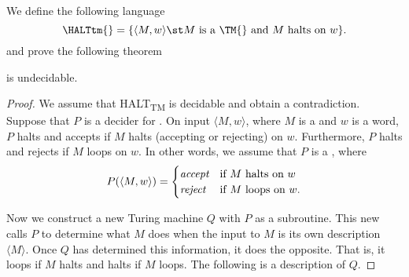 We define the following language
\begin{displaymath}
\text{\HALTtm{}} = \{ \langle M,w \rangle \st \text{\(M\) is a \TM{} and \(M\)
halts on \(w\)} \}.
\end{displaymath}
and prove the following theorem
\begin{theorem}\label{HALTtm}
\HALTtm{} is undecidable.
\end{theorem}
\begin{proof}
We assume that HALT\textsubscript{TM} is decidable and obtain a contradiction.
Suppose that \(P\) is a decider for \HALTtm{}.
On input \(\langle M, w \rangle\), where \(M\) is a \TM{} and \(w\) is a
word, \(P\) halts and accepts if \(M\) halts (accepting or rejecting) on \(w\).
Furthermore, \(P\) halts and rejects if
\(M\) loops on \(w\).
In other words, we assume that \(P\) is a \TM{}, where
\begin{displaymath}
P(\langle M, w\rangle) = \begin{cases}
	\emph{accept}&\text{if \(M\) halts on \(w\)}\\
	\emph{reject}&\text{if \(M\) loops on \(w\)}.
\end{cases}
\end{displaymath}

Now we construct a new Turing machine \(Q\) with \(P\) as a subroutine. This
new \TM{} calls \(P\) to determine what \(M\) does when the input to \(M\)
is its own
description \(\langle M \rangle\).
Once \(Q\) has determined this information, it does the opposite.
That is, it loops if \(M\) halts and halts if \(M\) loops.
The following is a description of \(Q\).


\end{proof}
